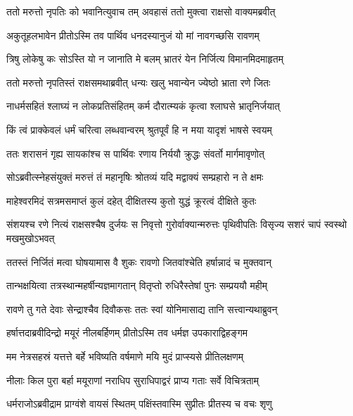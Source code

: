 \twolineshloka
{ततो मरुत्तो नृपतिः को भवानित्युवाच तम्}
{अवहासं ततो मुक्त्वा राक्षसो वाक्यमब्रवीत्} %

\twolineshloka
{अकुतूहलभावेन प्रीतोऽस्मि तव पार्थिव}
{धनदस्यानुजं यो मां नावगच्छसि रावणम्} %

\twolineshloka
{त्रिषु लोकेषु कः सोऽस्ति यो न जानाति मे बलम्}
{भ्रातरं येन निर्जित्य विमानमिदमाहृतम्} %

\twolineshloka
{ततो मरुत्तो नृपतिस्तं राक्षसमथाब्रवीत्}
{धन्यः खलु भवान्येन ज्येष्ठो भ्राता रणे जितः} %

\twolineshloka
{नाधर्मसहितं श्लाघ्यं न लोकप्रतिसंहितम्}
{कर्म दौरात्म्यकं कृत्वा श्लाघसे भ्रातृनिर्जयात्} %

\twolineshloka
{किं त्वं प्राक्केवलं धर्मं चरित्वा लब्धवान्वरम्}
{श्रुतपूर्वं हि न मया यादृशं भाषसे स्वयम्} %

\twolineshloka
{ततः शरासनं गृह्य सायकांश्च स पार्थिवः}
{रणाय निर्ययौ क्रुद्धः संवर्तो मार्गमावृणोत्} %

\twolineshloka
{सोऽब्रवीत्स्नेहसंयुक्तं मरुत्तं तं महानृषिः}
{श्रोतव्यं यदि मद्वाक्यं सम्प्रहारो न ते क्षमः} %

\twolineshloka
{माहेश्वरमिदं सत्रमसमाप्तं कुलं दहेत्}
{दीक्षितस्य कुतो युद्धं क्रूरत्वं दीक्षिते कुतः} %

\threelineshloka
{संशयश्च रणे नित्यं राक्षसश्चैष दुर्जयः}
{स निवृत्तो गुरोर्वाक्यान्मरुत्तः पृथिवीपतिः}
{विसृज्य सशरं चापं स्वस्थो मखमुखोऽभवत्} %

\twolineshloka
{ततस्तं निर्जितं मत्वा घोषयामास वै शुकः}
{रावणो जितवांश्चेति हर्षान्नादं च मुक्तवान्} %

\twolineshloka
{तान्भक्षयित्वा तत्रस्थान्महर्षीन्यज्ञमागतान्}
{वितृप्तो रुधिरैस्तेषां पुनः सम्प्रययौ महीम्} %

\twolineshloka
{रावणे तु गते देवाः सेन्द्राश्चैव दिवौकसः}
{ततः स्वां योनिमासाद्य तानि सत्त्वान्यथाब्रुवन्} %

\twolineshloka
{हर्षात्तदाब्रवीदिन्द्रो मयूरं नीलबर्हिणम्}
{प्रीतोऽस्मि तव धर्मज्ञ उपकाराद्विहङ्गम} %

\twolineshloka
{मम नेत्रसहस्रं यत्तत्ते बर्हे भविष्यति}
{वर्षमाणे मयि मुदं प्राप्स्यसे प्रीतिलक्षणम्} %

\twolineshloka
{नीलाः किल पुरा बर्हा मयूराणां नराधिप}
{सुराधिपाद्वरं प्राप्य गताः सर्वे विचित्रताम्} %

\twolineshloka
{धर्मराजोऽब्रवीद्राम प्राग्वंशे वायसं स्थितम्}
{पक्षिंस्तवास्मि सुप्रीतः प्रीतस्य च वचः शृणु} %

